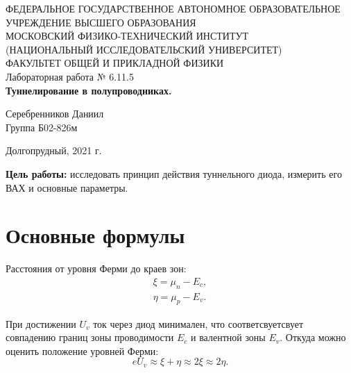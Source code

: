 \documentclass[a4paper,12pt]{article} %
\begin{document}
	\begin{center}
		\footnotesize{ФЕДЕРАЛЬНОЕ ГОСУДАРСТВЕННОЕ АВТОНОМНОЕ ОБРАЗОВАТЕЛЬНОЕ 			УЧРЕЖДЕНИЕ ВЫСШЕГО ОБРАЗОВАНИЯ}\\
		\footnotesize{МОСКОВСКИЙ ФИЗИКО-ТЕХНИЧЕСКИЙ ИНСТИТУТ\\(НАЦИОНАЛЬНЫЙ 			ИССЛЕДОВАТЕЛЬСКИЙ УНИВЕРСИТЕТ)}\\
		\footnotesize{ФАКУЛЬТЕТ ОБЩЕЙ И ПРИКЛАДНОЙ ФИЗИКИ\\}
		\hfill \break
		\hfill\break
		\hfill\break
		\hfill \break
		\hfill \break
		\hfill \break
		\hfill \break
		\hfill \break
		\hfill \break
		\hfill \break
		\hfill \break
		\hfill \break
		\hfill \break
		\hfill \break
		\large{Лабораторная работа № 6.11.5 \\\textbf{Туннелирование в полупроводниках.}}\\
		\hfill \break
		\hfill \break
		\hfill \break
		\begin{flushright}
			Серебренников Даниил\\
			Группа Б02-826м
		\end{flushright}
		\hfill \break
		\hfill \break
		\hfill \break
		\hfill \break
		\hfill \break
		\hfill \break
		\hfill \break
		\hfill \break
		\hfill \break
		\hfill \break
		\hfill \break
	\end{center}
	\begin{center}
		Долгопрудный, 2021 г.
	\end{center}
	\thispagestyle{empty}
	\newpage
	\textbf{Цель работы:} исследовать принцип действия туннельного диода, измерить его ВАХ и основные параметры.
	
	\section{Основные формулы}
	Расстояния от уровня Ферми до краев зон:
	\begin{equation*}
		\begin{gathered}
			\xi = \mu_n - E_c,\\
			\eta = \mu_p - E_v.
		\end{gathered}
	\end{equation*}

	 При достижении $U_v$ ток через диод минимален, что соответсвуетсвует совпадению границ зоны проводимости $E_c$ и валентной зоны $E_v$. Откуда можно оценить положение уровней Ферми:
	\begin{equation*}
		eU_v \approx \xi + \eta \approx 2\xi \approx 2\eta.
	\end{equation*}
\end{document}
